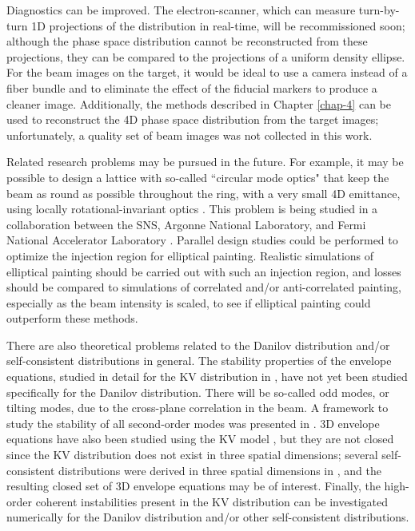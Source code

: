 Diagnostics can be improved. The electron-scanner, which can measure turn-by-turn 1D projections of the distribution in real-time, will be recommissioned soon; although the phase space distribution cannot be reconstructed from these projections, they can be compared to the projections of a uniform density ellipse. For the beam images on the target, it would be ideal to use a camera instead of a fiber bundle and to eliminate the effect of the fiducial markers to produce a cleaner image. Additionally, the methods described in Chapter \ref{chap-4} can be used to reconstruct the 4D phase space distribution from the target images; unfortunately, a quality set of beam images was not collected in this work. 

Related research problems may be pursued in the future. For example, it may be possible to design a lattice with so-called ``circular mode optics" that keep the beam as round as possible throughout the ring, with a very small 4D emittance, using locally rotational-invariant optics \cite{Burov2002}. This problem is being studied in a collaboration between the SNS, Argonne National Laboratory, and Fermi National Accelerator Laboratory \cite{Morozov-forthcoming}. Parallel design studies could be performed to optimize the injection region for elliptical painting. Realistic simulations of elliptical painting should be carried out with such an injection region, and losses should be compared to simulations of correlated and/or anti-correlated painting, especially as the beam intensity is scaled, to see if elliptical painting could outperform these methods.

There are also theoretical problems related to the Danilov distribution and/or self-consistent distributions in general. The stability properties of the envelope equations, studied in detail for the KV distribution in \cite{Lund2004}, have not yet been studied specifically for the Danilov distribution. There will be so-called odd modes, or tilting modes, due to the cross-plane correlation in the beam. A framework to study the stability of all second-order modes was presented in \cite{Yuan2017}. 3D envelope equations have also been studied using the KV model \cite{Qiang2018}, but they are not closed since the KV distribution does not exist in three spatial dimensions; several self-consistent distributions were derived in three spatial dimensions in \cite{Danilov2003}, and the resulting closed set of 3D envelope equations may be of interest. Finally, the high-order coherent instabilities present in the KV distribution can be investigated numerically for the Danilov distribution and/or other self-consistent distributions.
